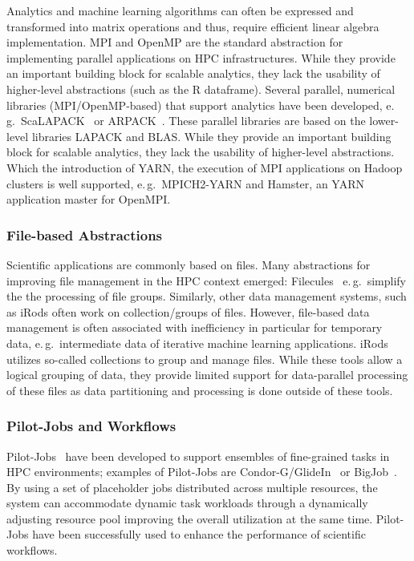 \documentclass{sig-alternate}
\newcommand{\pilotjobs}{Pilot-Jobs\xspace}
\begin{document}
Analytics and machine learning algorithms can often be expressed and
transformed into matrix operations and thus, require efficient linear algebra
implementation. MPI and OpenMP are the standard abstraction for implementing
parallel applications on HPC infrastructures. While they provide an important
building block for scalable analytics, they lack the usability of higher-level
abstractions (such as the R dataframe). Several parallel, numerical libraries
(MPI/OpenMP-based) that support analytics have been developed, e.\,g.\
ScaLAPACK~\cite{scalapack} or ARPACK~\cite{arpack}. These parallel libraries
are based on the lower-level libraries LAPACK and BLAS. While they provide an
important building block for scalable analytics, they lack the usability of
higher-level abstractions. Which the introduction of
YARN, the execution of MPI applications on Hadoop clusters is well supported,
e.\,g.\ MPICH2-YARN and Hamster, an YARN application master for OpenMPI.


\subsubsection*{File-based Abstractions}

Scientific applications are commonly based on files. Many abstractions for
improving file management in the HPC context emerged: Filecules~\cite{1652137}
e.\,g.\ simplify the the processing of file groups. Similarly, other data
management systems, such as iRods often work on collection/groups of files.
However, file-based data management is often associated with inefficiency in
particular for temporary data, e.\,g.\ intermediate data of iterative machine
learning applications. iRods~\cite{Rajasekar:2010:IPI:1855046} utilizes
so-called collections to group and manage files. While these tools allow a
logical grouping of data, they provide limited support for data-parallel
processing of these files as data partitioning and processing is done outside
of these tools.

\subsubsection*{\pilotjobs and Workflows}

\pilotjobs~\cite{pstar12} have been developed to support ensembles of
fine-grained tasks in HPC environments; examples of \pilotjobs are
Condor-G/GlideIn~\cite{glidein} or BigJob~\cite{saga_bigjob_condor_cloud}. By
using a set of placeholder jobs distributed across multiple resources, the
system can accommodate dynamic task workloads through a dynamically adjusting
resource pool improving the overall utilization at the same time. \pilotjobs
have been successfully used to enhance the performance of scientific workflows.
\end{document}
